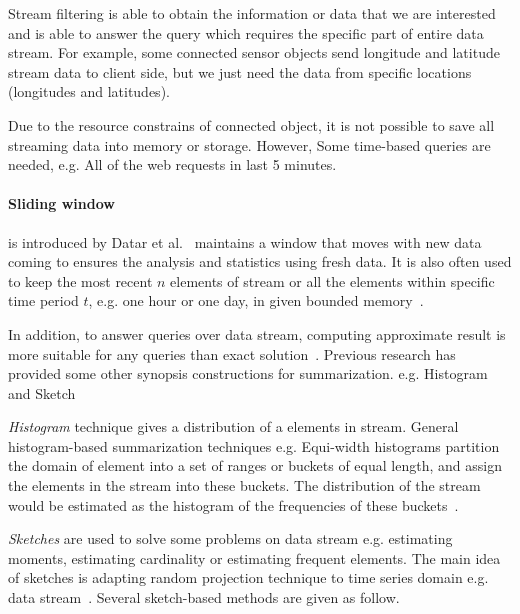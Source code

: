Stream filtering is able to obtain the information or data that we are
interested and is able to answer the query which requires the specific part of
entire data stream. For example, some connected sensor objects send longitude
and latitude stream data to client side, but we just need the data from specific
locations (longitudes and latitudes).


Due to the resource constrains of connected object, it is not possible to save
all streaming data into memory or storage. However, Some time-based queries are
needed, e.g. All of the web requests in last 5 minutes.

\paragraph{Sliding window} is introduced by Datar et
al.~\cite{datar2002maintaining} maintains a window that moves with new data
coming to ensures the analysis and statistics using fresh data. It is also often
used to keep the most recent $n$ elements of stream or all the elements within
specific time period $t$, e.g. one hour or one day, in given bounded
memory~\cite{leskovec2014mining}. 


In addition, to answer queries over data stream, computing approximate result is
more suitable for any queries than exact solution~\cite{kejariwal2015real}.
Previous research has provided some other synopsis constructions for
summarization. e.g. Histogram~\cite{hesabi2015data, poosala1999approximate} and
Sketch

\emph{Histogram} technique gives a distribution of a elements in stream. General
histogram-based summarization techniques e.g. Equi-width histograms partition
the domain of element into a set of ranges or buckets of equal length, and
assign the elements in the stream into these buckets. The distribution of the
stream would be estimated as the histogram of the frequencies of these
buckets~\cite{kejariwal2015real, ahmed2019data}.

\emph{Sketches} are used to solve some problems on data stream e.g. estimating
moments, estimating cardinality or estimating frequent elements. 
The main idea of sketches is adapting random projection technique to time series domain e.g. data stream~\cite{ahmed2019data}.
Several sketch-based
methods are given as follow.

